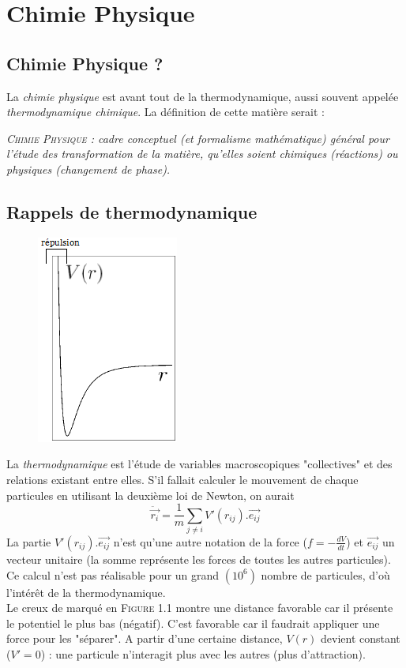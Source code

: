 \documentclass[11pt, a4paper, openany]{book}
\begin{document}
\chapter{Chimie Physique}
\section*{Chimie Physique ?}
La \textit{chimie physique} est avant tout de la thermodynamique, aussi souvent appelée \textit{thermodynamique chimique}. La définition de cette matière serait :
\begin{center}
\textit{\textsc{Chimie Physique} : cadre conceptuel (et formalisme mathématique) général pour l'étude des transformation de la matière, qu'elles soient chimiques (réactions) ou physiques (changement de phase).} \end{center}

\section{Rappels de thermodynamique}
\begin{figure}
\includegraphics[scale=0.6]{cp/image1.png}
\end{figure}
La \textit{thermodynamique} est l'étude de variables macroscopiques "collectives" et des relations existant entre elles. S'il fallait calculer le mouvement de chaque particules en utilisant la deuxième loi de Newton, on aurait
\begin{equation}
\ddot{\vec{r_i}} = \frac{1}{m}\sum_{j\neq i} V'(r_{ij}).\vec{e_{ij}}
\end{equation}
La partie $V'(r_{ij}).\vec{e_{ij}}$ n'est qu'une autre notation de la force ($f = -\frac{dV}{dt}$) et $\vec{e_{ij}}$ un vecteur unitaire (la somme représente les forces de toutes les autres particules). Ce calcul n'est pas réalisable pour un grand $(10^6)$ nombre de particules, d'où l'intérêt de la thermodynamique.\\
Le creux de marqué en \textsc{Figure 1.1} montre une distance favorable car il présente le potentiel le plus bas (négatif). C'est favorable car il faudrait appliquer une force pour les "séparer". A partir d'une certaine distance, $V(r)$ devient constant ($V' = 0$) : une particule n'interagit plus avec les autres (plus d'attraction).\\
\end{document}
